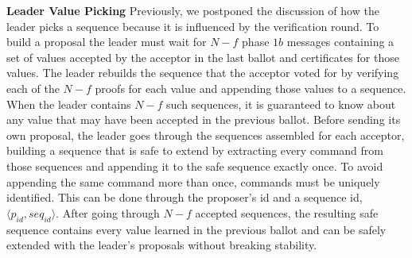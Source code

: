 \textbf{Leader Value Picking} Previously, we postponed the discussion of how the leader picks a sequence because it is influenced by the verification round. To build a proposal the leader must wait for $N-f$ phase $1b$ messages containing a set of values accepted by the acceptor in the last ballot and certificates for those values. The leader rebuilds the sequence that the acceptor voted for by verifying each of the $N-f$ proofs for each value and appending those values to a sequence. When the leader contains $N-f$ such sequences, it is guaranteed to know about any value that may have been accepted in the previous ballot. Before sending its own proposal, the leader goes through the sequences assembled for each acceptor, building a sequence that is safe to extend by extracting every command from those sequences and appending it to the safe sequence exactly once. To avoid appending the same command more than once, commands must be uniquely identified. This can be done through the proposer's id and a sequence id, $\langle p_{id}, seq_{id}\rangle$. After going through $N-f$ accepted sequences, the resulting safe sequence contains every value learned in the previous ballot and can be safely extended with the leader's proposals without breaking stability.